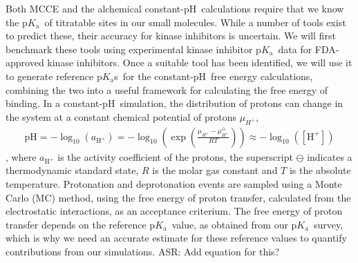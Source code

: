 \documentclass[10pt,final]{article}
\newcommand{\pKa}{p$K_\mathrm{a}$\ }
\newcommand{\pH}{p$\mathrm{H}$\ }
\newcommand{\pKas}{p$K_\mathrm{a}$s\ }
\begin{document}
Both MCCE and the alchemical constant-\pH calculations require that we know the \pKa of titratable sites in our small molecules. 
%
While a number of tools exist to predict these, their accuracy for kinase inhibitors is uncertain.
%
We will first benchmark these tools using experimental kinase inhibitor \pKa data for FDA-approved kinase inhibitors.
%
Once a suitable tool has been identified, we will use it to generate reference \pKas for the constant-\pH free energy calculations, combining the two into a useful framework for calculating the free energy of binding.
%
In a constant-\pH simulation, the distribution of protons can change in the system at a constant chemical potential of protons $\mu_{H^+}$,
\begin{align}
 \text{p}\mathrm{H} = -\log_{10}\left( a_{\mathrm{H}^+} \right) = -\log_{10}\left( \exp\left(\frac{\mu_{H^+} -\mu_{H^+}^\ominus}{RT}\right)\right) \approx -\log_{10}\left( [\mathrm{H}^+] \right) 
\end{align}
, where $a_{\mathrm{H}^+}$ is the activity coefficient of the protons, the superscript $\ominus$ indicates a thermodynamic standard state, $R$ is the molar gas constant and $T$ is the absolute temperature.
%
Protonation and deprotonation events are sampled using a Monte Carlo (MC) method, using the free energy of proton transfer, calculated from the electrostatic interactions, as an acceptance criterium.
%
The free energy of proton transfer depends on the reference \pKa value, as obtained from our \pKa survey, which is why we need an accurate estimate for these reference values to quantify contributions from our simulations.
{\color{purple} ASR: Add equation for this?}
%
\end{document}
